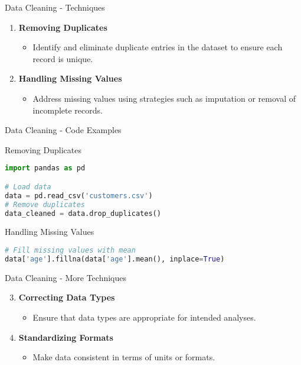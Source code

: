 \documentclass[aspectratio=169]{beamer}
\begin{document}
\begin{frame}[fragile]{Data Cleaning - Techniques}
    \begin{enumerate}
        \item \textbf{Removing Duplicates}
            \begin{itemize}
                \item Identify and eliminate duplicate entries in the dataset to ensure each record is unique.
            \end{itemize}
        \item \textbf{Handling Missing Values}
            \begin{itemize}
                \item Address missing values using strategies such as imputation or removal of incomplete records.
            \end{itemize}
    \end{enumerate}
\end{frame}

\begin{frame}[fragile]{Data Cleaning - Code Examples}
    \begin{block}{Removing Duplicates}
        \begin{lstlisting}[language=Python]
import pandas as pd

# Load data
data = pd.read_csv('customers.csv')
# Remove duplicates
data_cleaned = data.drop_duplicates()
        \end{lstlisting}
    \end{block}
    
    \begin{block}{Handling Missing Values}
        \begin{lstlisting}[language=Python]
# Fill missing values with mean
data['age'].fillna(data['age'].mean(), inplace=True)
        \end{lstlisting}
    \end{block}
\end{frame}

\begin{frame}[fragile]{Data Cleaning - More Techniques}
    \begin{enumerate}
        \setcounter{enumi}{2}
        \item \textbf{Correcting Data Types}
            \begin{itemize}
                \item Ensure that data types are appropriate for intended analyses.
            \end{itemize}
        \item \textbf{Standardizing Formats}
            \begin{itemize}
                \item Make data consistent in terms of units or formats.
            \end{itemize}
    \end{enumerate}
\end{frame}
\end{document}
